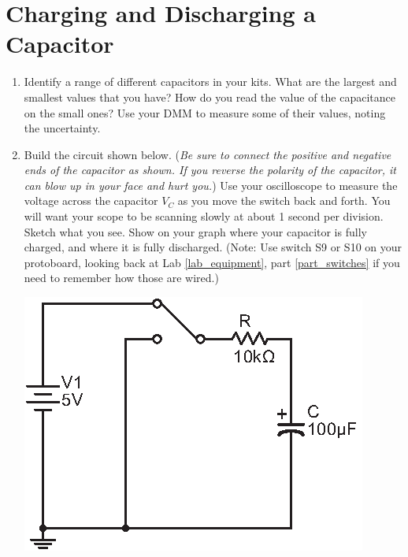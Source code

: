 \section{Charging and Discharging a Capacitor}
\label{lab_capacitors}
\pagestyle{labfancy} %


\bigskip

\begin{enumerate}[wide]

\item Identify a range of different capacitors in your kits.  What are the largest and smallest values that you have? How do you read the value of the capacitance on the small ones?  Use your DMM to measure some of their values, noting the uncertainty. 

\item Build the circuit shown below.  (\textit{Be sure to connect the positive and negative ends of the capacitor as shown.  If you reverse the polarity of the capacitor, it can blow up in your face and hurt you.})  Use your oscilloscope to measure the voltage across the capacitor $V_C$ as you move the switch back and forth.  You will want your scope to be scanning slowly at about 1 second per division.  Sketch what you see.  Show on your graph where your capacitor is fully charged, and where it is fully discharged.  (Note: Use switch S9 or S10 on your protoboard, looking back at Lab \ref{lab_equipment}, part \ref{part_switches} if you need to remember how those are wired.) \label{part_rc_circuit}
\begin{center}
\includegraphics{capacitors/single_dc_capacitor.eps}
\hspace{0.5in}
\end{center}


\end{enumerate}
